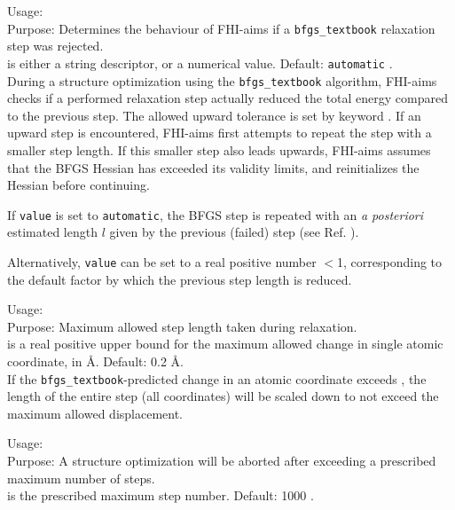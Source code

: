 {
  \noindent
  Usage:   \\[1.0ex]
  Purpose: Determines the behaviour of FHI-aims if a
     \texttt{bfgs\_textbook} relaxation step was
    rejected. \\[1.0ex]
   is either a string descriptor, or a numerical
    value. Default: \texttt{automatic} . \\
}
During a structure optimization using the 
\texttt{bfgs\_textbook} algorithm, FHI-aims checks if a performed relaxation
step actually reduced the total energy compared to the
previous step. The allowed upward tolerance is set by keyword
. If an upward step is encountered,
FHI-aims first attempts to repeat the step with a smaller step
length. If this smaller step also leads upwards, FHI-aims assumes
that the BFGS Hessian has exceeded its validity limits, and
reinitializes the Hessian before continuing. 

If \texttt{value} is set to \texttt{automatic}, the BFGS step is
repeated with an \emph{a posteriori} estimated length $l$ given by the
previous (failed) step (see Ref. \cite{Blum08}).

Alternatively, \texttt{value} can be set to a real positive number $<$1,
corresponding to the default factor by which the previous step length
is reduced. 

{
  \noindent
  Usage:   \\[1.0ex]
  Purpose: Maximum allowed step length taken during relaxation. \\[1.0ex]
   is a real positive upper bound for the maximum allowed
    change in single atomic coordinate, in {\AA}. Default: 0.2 {\AA}. \\
}
If the \texttt{bfgs\_textbook}-predicted change in an atomic coordinate exceeds
, the length of the entire step (all
coordinates) will be scaled down to not exceed the maximum allowed
displacement.

{
  \noindent
  Usage:   \\[1.0ex]
  Purpose: A structure optimization will be aborted after exceeding a
    prescribed maximum number of steps. \\[1.0ex]
     is the prescribed maximum step number. Default:
    1000 . \\
}

